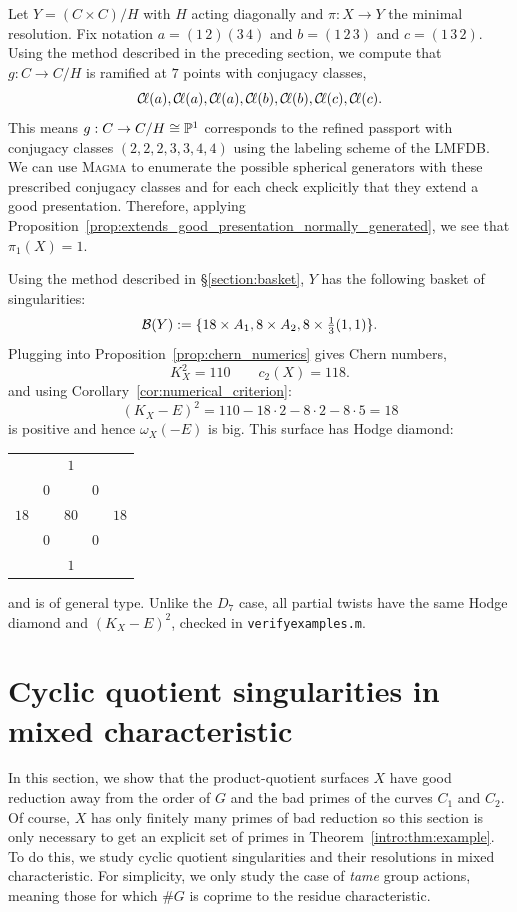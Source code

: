\documentclass[main.tex]{subfiles}
\begin{document}
Let $Y = (C \times C)/H$ with $H$ acting diagonally and $\pi : X \to Y$ the minimal resolution. Fix notation $a = (1 \, 2)(3 \, 4)$ and $b = (1 \, 2 \, 3)$ and $c = (1 \, 3 \, 2)$.
Using the method described in the preceding section, we compute that $g : C \to C / H$ is ramified at $7$ points with conjugacy classes,
\[ \Cl(a), \Cl(a), \Cl(a), \Cl(b), \Cl(b), \Cl(c), \Cl(c). \]
This means $g : C \to C / H \cong \P^1$ corresponds to the refined passport 
\cite{lmfdb:hgcwa-14.12-3.0.2-2-2-3-3-3-3.1} with conjugacy classes $(2, 2, 2, 3, 3, 4, 4)$ using the labeling scheme of the LMFDB. We can use \textsc{Magma} to enumerate the possible spherical generators with these prescribed conjugacy classes and for each check explicitly that they extend a good presentation. Therefore, applying Proposition~\ref{prop:extends_good_presentation_normally_generated}, we see that $\pi_1(X) = 1$. 
\par 
Using the method described in \S\ref{section:basket}, $Y$ has the following basket of singularities:
\[ \cB(Y) := \{ 18 \times A_1, 8 \times A_2, 8 \times \tfrac{1}{3} (1,1) \}. \]
Plugging into Proposition~\ref{prop:chern_numerics} gives Chern numbers,
\[ K_X^2 = 110 \quad \quad c_2(X) = 118. \]
and using Corollary~\ref{cor:numerical_criterion}:
\[ (K_X - E)^2 = 110 - 18 \cdot 2 - 8 \cdot 2 - 8 \cdot 5 = 18 \]
is positive and hence $\omega_X(-E)$ is big. This surface has Hodge diamond:
\begin{center}
\begin{tabular}{ccccc}
 &  & $1$ &  &  \\
 & $0$ &  & $0$ &  \\
$18$ &  & $80$ &  & $18$ \\
 & $0$ &  & $0$ &  \\
 &  & $1$ &  &  \\
\end{tabular}    
\end{center}
and is of general type. Unlike the $D_7$ case, all partial twists have the same Hodge diamond and $(K_X - E)^2$, checked in \texttt{verify\textunderscore examples.m}.

\section{Cyclic quotient singularities in mixed characteristic}

In this section, we show that the product-quotient surfaces $X$ have good reduction away from the order of $G$ and the bad primes of the curves $C_1$ and $C_2$. Of course, $X$ has only finitely many primes of bad reduction so this section is only necessary to get an explicit set of primes in Theorem~\ref{intro:thm:example}. To do this, we study cyclic quotient singularities and their resolutions in mixed characteristic. For simplicity, we only study the case of \textit{tame} group actions, meaning those for which $\# G$ is coprime to the residue characteristic.
\end{document}
